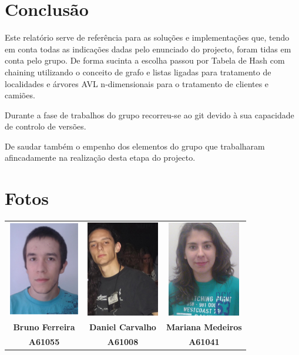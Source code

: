\documentclass[a5paper,twocolumn, 11pt]{article}
\def\hyph{-\penalty0\hskip0pt\relax}
\begin{document}
\clearpage
\section{Conclusão}
Este relatório serve de referência para as soluções e implementações que, tendo em conta todas as indicações dadas pelo enunciado do projecto, foram tidas em conta pelo grupo. De forma sucinta a escolha passou por Tabela de Hash com chaining utilizando o conceito de grafo e listas ligadas para tratamento de localidades e árvores AVL n\hyph{}dimensionais para o tratamento de clientes e camiões.

Durante a fase de trabalhos do grupo recorreu-se ao git devido à sua capacidade de controlo de versões.

De saudar também o empenho dos elementos do grupo que trabalharam afincadamente na realização desta etapa do projecto.

\clearpage
\onecolumn
\section{Fotos}
\begin{center}
    \begin{tabular}{ccc}
        \includegraphics[width=90pt]{bruno.png}&
        \includegraphics[width=90pt]{daniel.png}&
        \includegraphics[width=90pt]{mariana.png}\\
        
        \small{\textbf{Bruno Ferreira}}&
        \small{\textbf{Daniel Carvalho}}&
        \small{\textbf{Mariana Medeiros}}\\
        \small{\textbf{A61055}}&
        \small{\textbf{A61008}}&
        \small{\textbf{A61041}}\\
    \end{tabular}
\end{center}
\end{document}
